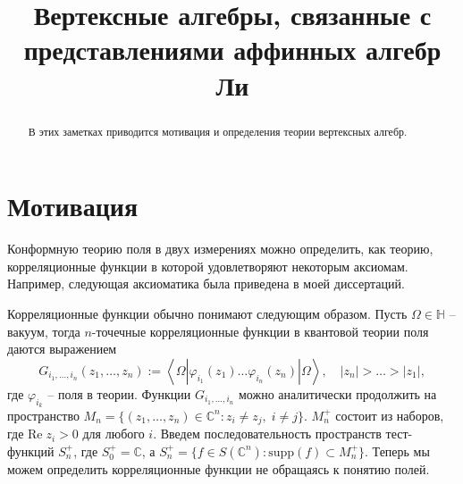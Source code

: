 \documentclass[12pt]{article}
\begin{document}
\title{Вертексные алгебры, связанные с представлениями аффинных алгебр Ли}

\maketitle

\begin{abstract}
  В этих заметках приводится мотивация и определения теории вертексных алгебр.
\end{abstract}

\section{Мотивация}

Конформную теорию поля в двух измерениях можно определить, как теорию, корреляционные функции в
которой удовлетворяют некоторым аксиомам. Например, следующая аксиоматика была приведена в моей
диссертаций. 

Корреляционные функции обычно понимают следующим образом. Пусть $\Omega\in\mathbb{H}$ -- вакуум,
тогда $n$-точечные корреляционные функции в квантовой теории поля даются выражением
\begin{equation}
  \label{eq:50}
  G_{i_{1},\dots ,i_{n}}(z_{1},\dots,z_{n}):=\left<\Omega|\varphi_{i_{1}}(z_{1})\dots \varphi_{i_{n}}(z_{n})|\Omega\right>, \quad |z_{n}|>\dots > |z_{1}|,
\end{equation}
где $\varphi_{i_{k}}$ -- поля в теории. Функции $G_{i_{1},\dots,i_{n}}$ можно аналитически
продолжить на пространство $M_{n}=\{(z_{1},\dots,z_{n})\in \mathbb{C}^{n}: z_{i}\neq z_{j},\; i\neq
j\}$. $M_{n}^{+}$ состоит из наборов, где $\mathrm{Re}\;z_{i}>0$ для любого $i$. Введем
последовательность пространств тест-функций $S_{n}^{+}$, где $S_{0}^{+}=\mathbb{C}$, а
$S_{n}^{+}=\{f\in S(\mathbb{C}^{n}): \mathrm{supp}(f)\subset M^{+}_{n}\} $. Теперь мы можем
определить корреляционные функции не обращаясь к понятию полей.
\end{document}
